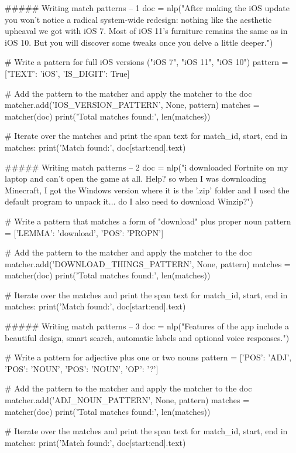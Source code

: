 ##### Writing match patterns  -- 1
doc = nlp("After making the iOS update you won't notice a radical system-wide redesign: nothing like the aesthetic upheaval we got with iOS 7. Most of iOS 11's furniture remains the same as in iOS 10. But you will discover some tweaks once you delve a little deeper.")

# Write a pattern for full iOS versions ("iOS 7", "iOS 11", "iOS 10")
pattern = [{'TEXT': 'iOS'}, {'IS_DIGIT': True}]

# Add the pattern to the matcher and apply the matcher to the doc
matcher.add('IOS_VERSION_PATTERN', None, pattern)
matches = matcher(doc)
print('Total matches found:', len(matches))

# Iterate over the matches and print the span text
for match_id, start, end in matches:
    print('Match found:', doc[start:end].text)


##### Writing match patterns  -- 2
doc = nlp("i downloaded Fortnite on my laptop and can't open the game at all. Help? so when I was downloading Minecraft, I got the Windows version where it is the '.zip' folder and I used the default program to unpack it... do I also need to download Winzip?")

# Write a pattern that matches a form of "download" plus proper noun
pattern = [{'LEMMA': 'download'}, {'POS': 'PROPN'}]

# Add the pattern to the matcher and apply the matcher to the doc
matcher.add('DOWNLOAD_THINGS_PATTERN', None, pattern)
matches = matcher(doc)
print('Total matches found:', len(matches))

# Iterate over the matches and print the span text
for match_id, start, end in matches:
    print('Match found:', doc[start:end].text)


##### Writing match patterns  -- 3
doc = nlp("Features of the app include a beautiful design, smart search, automatic labels and optional voice responses.")

# Write a pattern for adjective plus one or two nouns
pattern = [{'POS': 'ADJ'}, {'POS': 'NOUN'}, {'POS': 'NOUN', 'OP': '?'}]

# Add the pattern to the matcher and apply the matcher to the doc
matcher.add('ADJ_NOUN_PATTERN', None, pattern)
matches = matcher(doc)
print('Total matches found:', len(matches))

# Iterate over the matches and print the span text
for match_id, start, end in matches:
    print('Match found:', doc[start:end].text)
